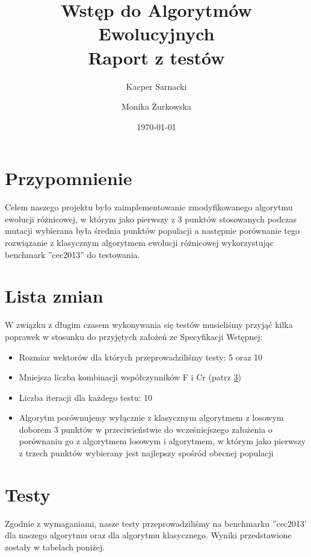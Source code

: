\documentclass[a4paper]{article}
\title{Wstęp do Algorytmów Ewolucyjnych \\
	\large Raport z testów}
\date{\today}
\author{Kacper Sarnacki \and Monika Żurkowska}
\begin{document}
\maketitle

\section{Przypomnienie}
Celem naszego projektu było zaimplementowanie zmodyfikowanego algorytmu ewolucji różnicowej, w którym jako pierwszy z 3 punktów stosowanych podczas mutacji wybierana była średnia punktów populacji a następnie porównanie tego rozwiązanie z klasycznym algorytmem ewolucji różnicowej wykorzystując benchmark ''cec2013'' do testowania.

\section{Lista zmian}
W związku z długim czasem wykonywania się testów musieliśmy przyjąć kilka poprawek w stosunku do przyjętych założeń ze Specyfikacji Wstępnej:

\begin{itemize}
\item Rozmiar wektorów dla których przeprowadziliśmy testy: 5 oraz 10
\item Mniejsza liczba kombinacji współczynników F i Cr (patrz \ref{sec:testy})
\item Liczba iteracji dla każdego testu: 10
\item  Algorytm porównujemy wyłącznie z klasycznym algorytmem z losowym doborem 3 punktów w przeciwieństwie do wcześniejszego założenia o porównaniu go z algorytmem losowym i algorytmem, w którym jako pierwszy z trzech punktów wybierany jest najlepszy spośród obecnej populacji
\end{itemize}

\section{Testy}
\label{sec:testy}

Zgodnie z wymaganiami, nasze testy przeprowadziliśmy na benchmarku ''cec2013' dla naszego algorytmu oraz dla algorytmu klasycznego. Wyniki przedstawione zostały w tabelach poniżej.
\end{document}
